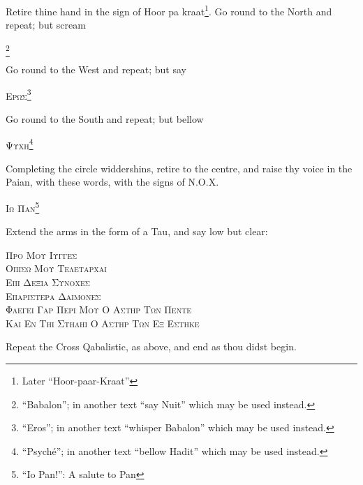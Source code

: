 Retire thine hand in the sign of Hoor pa kraat\footnote{Later \enquote{Hoor-paar-Kraat}}. Go round to the North and repeat; but scream \begin{quoting}[indentfirst=false]\textgreek{\textsc{\GreekBabalon}}\footnote{\enquote{Babalon}; in another text \enquote{say Nuit} which may be used instead.} \end{quoting}

Go round to the West and repeat; but say \begin{quoting}[indentfirst=false]\textgreek{\textsc{Ερωσ}}\footnote{\enquote{Eros}; in another text \enquote{whisper Babalon} which may be used instead.} \end{quoting}

Go round to the South and repeat; but bellow \begin{quoting}[indentfirst=false]\textgreek{\textsc{Ψυχη}}\footnote{\enquote{Psych\'e}; in another text \enquote{bellow Hadit} which may be used instead.} \end{quoting}

Completing the circle widdershins, retire to the centre, and raise thy voice in the Paian, with these words, with the signs of N.O.X. \begin{quoting}[indentfirst=false]\textgreek{\textsc{Ιω Παν}}\footnote{\enquote{Io Pan!}: A salute to Pan}\end{quoting}

Extend the arms in the form of a Tau, and say low but clear:

\begin{quoting}[indentfirst=false]
\textgreek{\textsc{Προ Μου Ιυγγεσ}} \\
\textgreek{\textsc{Οπισω Μου Τελεταρχαι}} \\
\textgreek{\textsc{Επι Δεξια Συνοχεσ}} \\
\textgreek{\textsc{Επαριστερα Δαιμονεσ}} \\
\textgreek{\textsc{Φλεγει Γαρ Περι Μου Ο Αστηρ Των Πεντε}} \\
\textgreek{\textsc{Και Εν Τηι Στηληι Ο Αστηρ Των Εξ Εστηκε}}\footnotemark
\end{quoting}

Repeat the Cross Qabalistic, as above, and end as thou didst begin.
